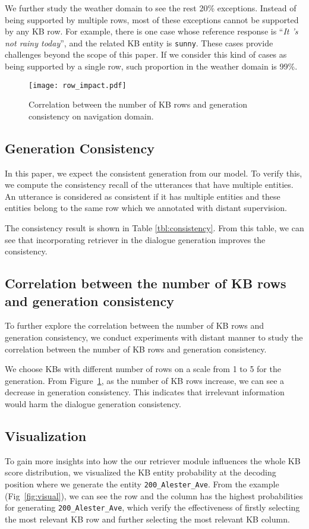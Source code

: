 \documentclass[11pt,a4paper]{article}
\begin{document}
 We further study the weather domain
 to see the rest 20\% exceptions.
 Instead of being supported by multiple rows,
 most of these exceptions cannot be supported by any KB row.
 For example, there is one case whose reference response is ``\textit{It 's not rainy today}'',
 and the related KB entity is \texttt{sunny}.
 These cases provide challenges beyond the scope of this paper.
 If we consider this kind of cases as being supported by a single row,
 such proportion in the weather domain is 99\%.


\begin{figure}[t!]
	\centering
	\texttt{[image: row\_impact.pdf]}
	\caption{Correlation between the number of KB rows and generation consistency on navigation domain.}\label{fig:row_num}
\end{figure}


\subsection{{Generation Consistency}}
In this paper,
we expect the consistent generation
from our model.
To verify this, we compute the consistency recall
of the utterances that have multiple entities.
An utterance is considered as consistent
if it has multiple entities and these entities belong to the same row which we annotated with distant supervision.

The consistency result is shown in Table \ref{tbl:consistency}.
From this table, we can see that incorporating retriever
in the dialogue generation improves the consistency.

\subsection{{Correlation between the number of KB rows and generation consistency}}
To further explore the correlation between the number of KB rows and generation consistency,
we conduct experiments with distant manner to  study the correlation between the number of KB rows and generation consistency.

We choose KBs with different number of rows on a scale from 1 to 5  for the generation.
From Figure~\ref{fig:row_num}, as the number of KB rows increase, 
we can see a decrease in generation consistency.
This indicates that irrelevant information would harm the dialogue generation consistency.


 	\subsection{Visualization}
To gain more insights into how the our retriever module influences the whole KB score distribution, we visualized the KB entity probability at the decoding position where we generate the entity \texttt{200\_Alester\_Ave}.
From the example (Fig~\ref{fig:visual}), we can see the  row and the  column has the highest probabilities for generating \texttt{200\_Alester\_Ave}, 
which verify the effectiveness of  firstly selecting the most relevant KB row and further selecting
the most relevant KB column.
\end{document}
